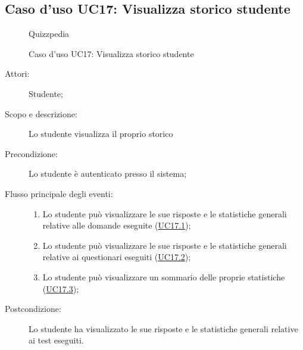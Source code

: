 \subsection{Caso d'uso UC17: Visualizza storico studente}
        \begin{figure}[H]
            \centering
            \begin{resizedtikzpicture}{\textwidth}
		\begin{umlsystem}[x=0, fill=lightgray!20]{Quizzpedia}
		\end{umlsystem}
            \end{resizedtikzpicture}
            \caption{Caso d'uso UC17: Visualizza storico studente}
            \label{fig:UC17} 
        \end{figure}
    \begin{description}
\item[Attori:] Studente;
\item[Scopo e descrizione:] Lo studente visualizza il proprio storico
      \item[Precondizione:] Lo studente è autenticato presso il sistema;

        \item[Flusso principale degli eventi:] \begin{enumerate}
          \item Lo studente può visualizzare le sue risposte e le statistiche generali relative alle domande eseguite (\hyperlink{UC17.1}{UC17.1});
          \item Lo studente può visualizzare le sue risposte e le statistiche generali relative ai questionari eseguiti (\hyperlink{UC17.2}{UC17.2});
          \item Lo studente può visualizzare un sommario delle proprie statistiche (\hyperlink{UC17.3}{UC17.3});

      \end{enumerate}
    \item[Postcondizione:] Lo studente ha visualizzato le sue risposte e le statistiche generali relative ai test eseguiti.
  \end{description}
\hypertarget{UC17.1}{}
